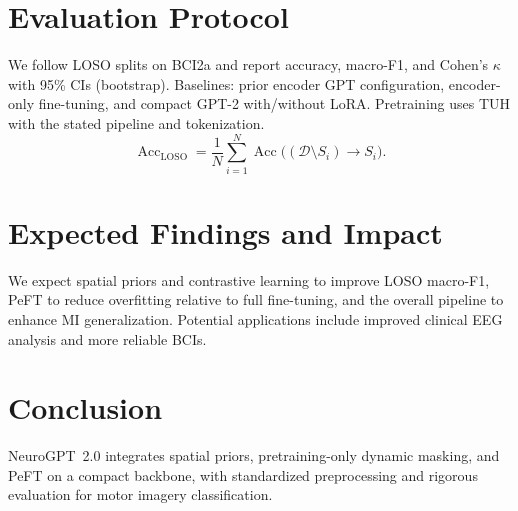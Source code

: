 \documentclass[letterpaper]{article}
\begin{document}
\section{Evaluation Protocol}
We follow LOSO splits on BCI2a and report accuracy, macro-F1, and Cohen's $\kappa$ with 95\% CIs (bootstrap). Baselines: prior encoder\,\textendash\,GPT configuration, encoder-only fine-tuning, and compact GPT-2 with/without LoRA. Pretraining uses TUH with the stated pipeline and tokenization.
\begin{equation}
\operatorname{Acc}_{\mathrm{LOSO}} = \frac{1}{N}\sum_{i=1}^{N} \operatorname{Acc}\big( (\mathcal{D} \setminus S_i) \to S_i \big).
\end{equation}

\section{Expected Findings and Impact}
We expect spatial priors and contrastive learning to improve LOSO macro-F1, PeFT to reduce overfitting relative to full fine-tuning, and the overall pipeline to enhance MI generalization. Potential applications include improved clinical EEG analysis and more reliable BCIs.

\section{Conclusion}
NeuroGPT~2.0 integrates spatial priors, pretraining-only dynamic masking, and PeFT on a compact backbone, with standardized preprocessing and rigorous evaluation for motor imagery classification.



\end{document}
